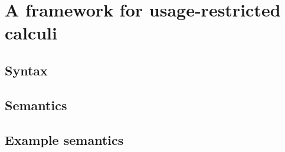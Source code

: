 \chapter{A framework for usage-restricted calculi}\label{sec:framework}

\section{Syntax}



\section{Semantics}



\section{Example semantics}



